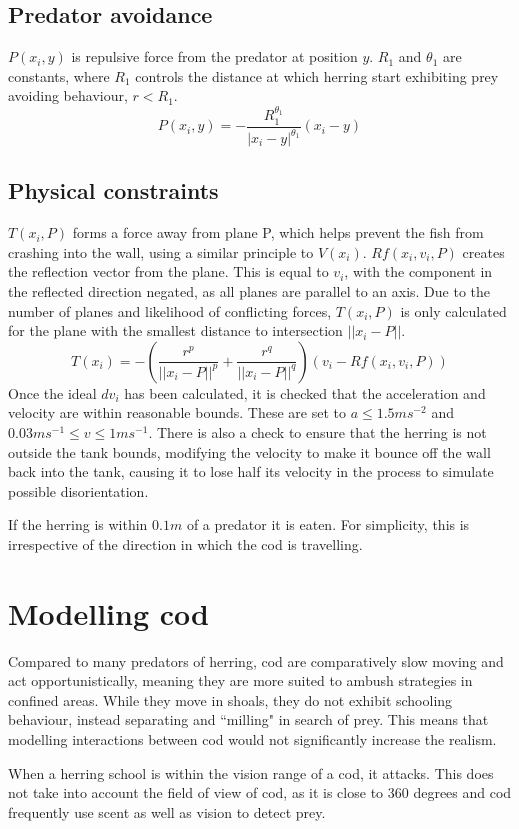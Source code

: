 \documentclass[12pt]{article}
\begin{document}
\subsection{Predator avoidance}
$P(x_i,y)$ is repulsive force from the predator at position $y$. $R_1$ and $\theta_1$ are constants, where $R_1$ controls the distance at which herring start exhibiting prey avoiding behaviour, $r<R_1$.
\begin{equation}
    P(x_i,y) =-\frac{R_1^{\theta_1}}{|x_i-y|^{\theta_1}}(x_i-y)
\end{equation}
\subsection{Physical constraints}
$T(x_i,P)$ forms a force away from plane P, which helps prevent the fish from crashing into the wall, using a similar principle to $V(x_i)$\supercite{TaNguyenYagi2017_foraging}. $Rf(x_i,v_i,P)$ creates the reflection vector from the plane. This is equal to $v_i$, with the component in the reflected direction negated, as all planes are parallel to an axis. Due to the number of planes and likelihood of conflicting forces, $T(x_i,P)$ is only calculated for the plane with the smallest distance to intersection $||x_i-P||$.
\begin{equation}
    T(x_i)=-\left(\frac{r^p}{||x_i-P||^p}+\frac{r^q}{||x_i-P||^q}\right)(v_i -  Rf(x_i, v_i, P))
\end{equation}
Once the ideal $dv_i$ has been calculated, it is checked that the acceleration and velocity are within reasonable bounds\supercite{Giske2008_EmergingSchoolStructures}. These are set to $a\le1.5ms^{-2}$ and $0.03ms^{-1}\le v \le 1ms^{-1}$. There is also a check to ensure that the herring is not outside the tank bounds, modifying the velocity to make it bounce off the wall back into the tank, causing it to lose half its velocity in the process to simulate possible disorientation.\par
If the herring is within $0.1m$ of a predator it is eaten. For simplicity, this is irrespective of the direction in which the cod is travelling.
\section{Modelling cod}
Compared to many predators of herring, cod are comparatively slow moving and act opportunistically, meaning they are more suited to ambush strategies in confined areas. While they move in shoals, they do not exhibit schooling behaviour, instead separating and ``milling" in search of prey\supercite{Rillahan2008}. This means that modelling interactions between cod would not significantly increase the realism.\par
When a herring school is within the vision range of a cod, it attacks. This does not take into account the field of view of cod, as it is close to 360 degrees and cod frequently use scent as well as vision\supercite{johannesen2013predator} to detect prey.
\end{document}
